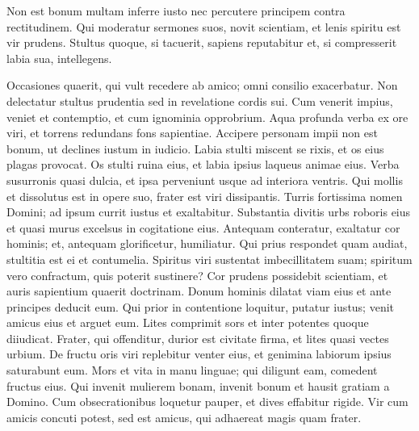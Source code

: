 \begin{biblechapter}
\begin{biblechapter}
\begin{biblechapter}
\begin{biblechapter}
\begin{biblechapter}
\begin{biblechapter}
\begin{biblechapter}
\begin{biblechapter}
\begin{biblechapter}
\begin{biblechapter}
\begin{biblechapter}
\begin{biblechapter}
\begin{biblechapter}
\begin{biblechapter}
\begin{biblechapter}
\begin{biblechapter}
\begin{biblechapter}
 \verse Non est bonum multam inferre iusto
 nec percutere principem contra rectitudinem.
 \verse Qui moderatur sermones suos, novit scientiam,
 et lenis spiritu est vir prudens.
 \verse Stultus quoque, si tacuerit, sapiens reputabitur
 et, si compresserit labia sua, intellegens.
 
\begin{biblechapter}
 \verse Occasiones quaerit, qui vult recedere ab amico;
 omni consilio exacerbatur.
 \verse Non delectatur stultus prudentia
 sed in revelatione cordis sui.
 \verse Cum venerit impius, veniet et contemptio,
 et cum ignominia opprobrium.
 \verse Aqua profunda verba ex ore viri,
 et torrens redundans fons sapientiae.
 \verse Accipere personam impii non est bonum,
 ut declines iustum in iudicio.
 \verse Labia stulti miscent se rixis,
 et os eius plagas provocat.
 \verse Os stulti ruina eius,
 et labia ipsius laqueus animae eius.
 \verse Verba susurronis quasi dulcia,
 et ipsa perveniunt usque ad interiora ventris.
 \verse Qui mollis et dissolutus est in opere suo,
 frater est viri dissipantis.
 \verse Turris fortissima nomen Domini;
 ad ipsum currit iustus et exaltabitur.
 \verse Substantia divitis urbs roboris eius
 et quasi murus excelsus in cogitatione eius.
 \verse Antequam conteratur, exaltatur cor hominis;
 et, antequam glorificetur, humiliatur.
 \verse Qui prius respondet quam audiat,
 stultitia est ei et contumelia.
 \verse Spiritus viri sustentat imbecillitatem suam;
 spiritum vero confractum, quis poterit sustinere?
 \verse Cor prudens possidebit scientiam,
 et auris sapientium quaerit doctrinam.
 \verse Donum hominis dilatat viam eius
 et ante principes deducit eum.
 \verse Qui prior in contentione loquitur, putatur iustus;
 venit amicus eius et arguet eum.
 \verse Lites comprimit sors
 et inter potentes quoque diiudicat.
 \verse Frater, qui offenditur, durior est civitate firma,
 et lites quasi vectes urbium.
 \verse De fructu oris viri replebitur venter eius,
 et genimina labiorum ipsius saturabunt eum.
 \verse Mors et vita in manu linguae;
 qui diligunt eam, comedent fructus eius.
 \verse Qui invenit mulierem bonam, invenit bonum
 et hausit gratiam a Domino.
 \verse Cum obsecrationibus loquetur pauper,
 et dives effabitur rigide.
 \verse Vir cum amicis concuti potest,
 sed est amicus, qui adhaereat magis quam frater.
 

\end{biblechapter}
\end{biblechapter}
\end{biblechapter}
\end{biblechapter}
\end{biblechapter}
\end{biblechapter}
\end{biblechapter}
\end{biblechapter}
\end{biblechapter}
\end{biblechapter}
\end{biblechapter}
\end{biblechapter}
\end{biblechapter}
\end{biblechapter}
\end{biblechapter}
\end{biblechapter}
\end{biblechapter}
\end{biblechapter}
